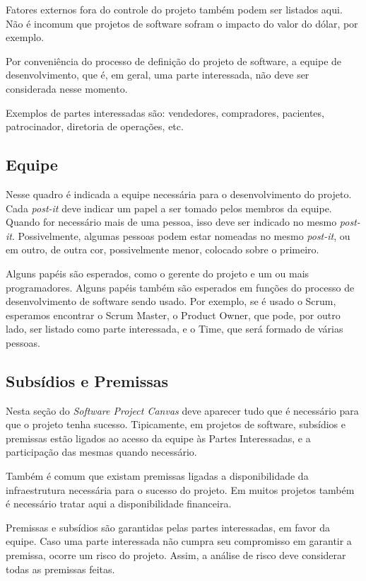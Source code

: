 \documentclass[fontsize=12pt, a4paper,pagesize=auto,toc=listof, ,twoside,chapterprefix=false,appendixprefix=true,open=right]{scrbook}
\begin{document}
Fatores externos fora do controle do projeto também podem ser listados aqui.
Não é incomum que projetos de software sofram o impacto do valor do dólar, por exemplo.

Por conveniência do processo de definição do projeto de software, a equipe de desenvolvimento, que é, em geral, uma parte interessada, não deve ser considerada nesse momento.

Exemplos de partes interessadas são: vendedores, compradores, pacientes, patrocinador, diretoria de operações, etc.

\subsection{Equipe}

Nesse quadro é indicada a equipe necessária para o desenvolvimento do projeto.
Cada \textit{post-it} deve indicar um papel a ser tomado pelos membros da equipe.
Quando for necessário mais de uma pessoa, isso deve ser indicado no mesmo \textit{post-it}.
Possivelmente, algumas pessoas podem estar nomeadas no mesmo \textit{post-it}, ou em outro, de outra cor, possivelmente menor, colocado sobre o primeiro.

Alguns papéis são esperados\citeauthor{finocchio:2013}, como o gerente do projeto e um ou mais programadores.
Alguns papéis também são esperados em funções do processo de desenvolvimento de software sendo usado.
Por exemplo, se é usado o Scrum, esperamos encontrar o Scrum Master, o Product Owner, que pode, por outro lado, ser listado como parte interessada, e o Time, que será formado de várias pessoas.

\subsection{Subsídios e Premissas}

Nesta seção do \textit{Software Project Canvas} deve aparecer tudo que é necessário para que o projeto tenha sucesso.
Tipicamente, em projetos de software, subsídios e premissas estão ligados ao acesso da equipe às Partes Interessadas, e a participação das mesmas quando necessário.

Também é comum que existam premissas ligadas a disponibilidade da infraestrutura necessária para o sucesso do projeto.
Em muitos projetos também é necessário tratar aqui a disponibilidade financeira.

Premissas e subsídios são garantidas pelas partes interessadas, em favor da equipe.
Caso uma parte interessada não cumpra seu compromisso em garantir a premissa, ocorre um risco do projeto. Assim, a análise de risco deve considerar todas as premissas feitas.
\end{document}
